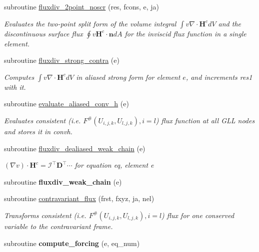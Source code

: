 \begin{DoxyCompactItemize}
\item 
subroutine \hyperlink{group__convhvol_ga72c1cbe51bc537e14ec8927e62f0e3f3}{fluxdiv\-\_\-2point\-\_\-noscr} (res, fcons, e, ja)
\begin{DoxyCompactList}\small\item\em Evaluates the two-\/point split form of the volume integral $\int v \nabla\cdot\mathbf{H}^c dV$ and the discontinuous surface flux $\oint v \mathbf{H}^c\cdot\mathbf{n} dA$ for the inviscid flux function in a single element. \end{DoxyCompactList}\item 
\hypertarget{group__convhvol_gab4831bb28a78e1c8fd3ec09854bd15ad}{subroutine \hyperlink{group__convhvol_gab4831bb28a78e1c8fd3ec09854bd15ad}{fluxdiv\-\_\-strong\-\_\-contra} (e)}\label{group__convhvol_gab4831bb28a78e1c8fd3ec09854bd15ad}

\begin{DoxyCompactList}\small\item\em Computes $\int v \nabla\cdot\mathbf{H}^c dV$ in aliased strong form for element $e$, and increments res1 with it. \end{DoxyCompactList}\item 
subroutine \hyperlink{group__convhvol_gad9d70d83f1184d25495812d637698102}{evaluate\-\_\-aliased\-\_\-conv\-\_\-h} (e)
\begin{DoxyCompactList}\small\item\em Evaluates consistent (i.\-e. $F^{\#}(U_{i,j,k},U_{l,j,k}),i=l$) flux function at all G\-L\-L nodes and stores it in convh. \end{DoxyCompactList}\item 
\hypertarget{group__convhvol_ga89ba8fe53f8afc523597773aca62a270}{subroutine \hyperlink{group__convhvol_ga89ba8fe53f8afc523597773aca62a270}{fluxdiv\-\_\-dealiased\-\_\-weak\-\_\-chain} (e)}\label{group__convhvol_ga89ba8fe53f8afc523597773aca62a270}

\begin{DoxyCompactList}\small\item\em $(\nabla v)\cdot \mathbf{H}^c=\mathcal{I}^{\intercal}\mathbf{D}^{\intercal}\cdots$ for equation eq, element e \end{DoxyCompactList}\item 
\hypertarget{eqnsolver__cmt_8f_a67c37779e77c6d9a630d38fe92314c23}{subroutine {\bfseries fluxdiv\-\_\-weak\-\_\-chain} (e)}\label{eqnsolver__cmt_8f_a67c37779e77c6d9a630d38fe92314c23}

\item 
subroutine \hyperlink{group__convhvol_ga72103225babeca7679ef8b9a41d08f2e}{contravariant\-\_\-flux} (frst, fxyz, ja, nel)
\begin{DoxyCompactList}\small\item\em Transforms consistent (i.\-e. $F^{\#}(U_{i,j,k},U_{l,j,k}),i=l$) flux for one conserved variable to the contravariant frame. \end{DoxyCompactList}\item 
\hypertarget{eqnsolver__cmt_8f_a16ab9195e1b629e65603f74643f877bb}{subroutine {\bfseries compute\-\_\-forcing} (e, eq\-\_\-num)}\label{eqnsolver__cmt_8f_a16ab9195e1b629e65603f74643f877bb}


\end{DoxyCompactItemize}
